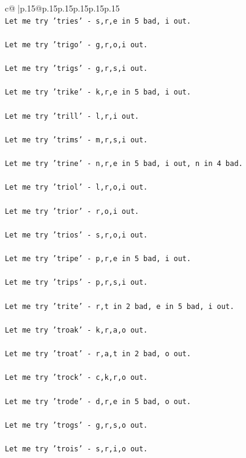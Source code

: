 \documentclass{article}
\begin{document}
{\begin{supertabular}{c@{$\;$}|p{.15\linewidth}@{}p{.15\linewidth}p{.15\linewidth}p{.15\linewidth}p{.15\linewidth}p{.15\linewidth}}
{{{\\ 
\texttt{Let me try 'tries' {-} s,r,e in 5 bad, i out. } \\
\\ 
\texttt{Let me try 'trigo' {-} g,r,o,i out. } \\
\\ 
\texttt{Let me try 'trigs' {-} g,r,s,i out. } \\
\\ 
\texttt{Let me try 'trike' {-} k,r,e in 5 bad, i out. } \\
\\ 
\texttt{Let me try 'trill' {-} l,r,i out. } \\
\\ 
\texttt{Let me try 'trims' {-} m,r,s,i out. } \\
\\ 
\texttt{Let me try 'trine' {-} n,r,e in 5 bad, i out, n in 4 bad. } \\
\\ 
\texttt{Let me try 'triol' {-} l,r,o,i out. } \\
\\ 
\texttt{Let me try 'trior' {-} r,o,i out. } \\
\\ 
\texttt{Let me try 'trios' {-} s,r,o,i out. } \\
\\ 
\texttt{Let me try 'tripe' {-} p,r,e in 5 bad, i out. } \\
\\ 
\texttt{Let me try 'trips' {-} p,r,s,i out. } \\
\\ 
\texttt{Let me try 'trite' {-} r,t in 2 bad, e in 5 bad, i out. } \\
\\ 
\texttt{Let me try 'troak' {-} k,r,a,o out. } \\
\\ 
\texttt{Let me try 'troat' {-} r,a,t in 2 bad, o out. } \\
\\ 
\texttt{Let me try 'trock' {-} c,k,r,o out. } \\
\\ 
\texttt{Let me try 'trode' {-} d,r,e in 5 bad, o out. } \\
\\ 
\texttt{Let me try 'trogs' {-} g,r,s,o out. } \\
\\ 
\texttt{Let me try 'trois' {-} s,r,i,o out. } \\
}}}
\end{supertabular}}
\end{document}
